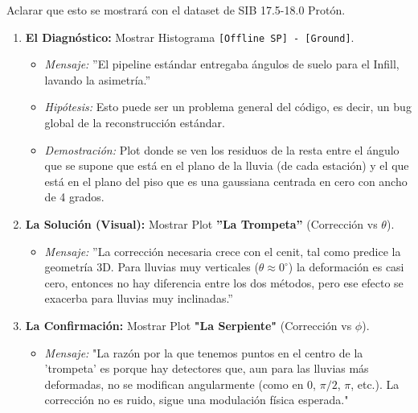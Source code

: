 Aclarar que esto se mostrará con el dataset de SIB 17.5-18.0 Protón.
\begin{enumerate}
	\item \textbf{El Diagnóstico:} Mostrar Histograma \texttt{[Offline SP] - [Ground]}.
	\begin{itemize}
		\item \textit{Mensaje:} ''El pipeline estándar entregaba ángulos de suelo para el Infill, lavando la asimetría.''
		\item \textit{Hipótesis:} Esto puede ser un problema general del código, es decir, un bug global de la reconstrucción estándar.
		\item \textit{Demostración:} Plot donde se ven los residuos de la resta entre el ángulo que se supone que está en el plano de la lluvia (de cada estación) y el que está en el plano del piso que es una gaussiana centrada en cero con ancho de 4 grados.
	\end{itemize}
	\item \textbf{La Solución (Visual):} Mostrar Plot \textbf{''La Trompeta''} (Corrección vs $\theta$).
	\begin{itemize}
		\item \textit{Mensaje:} ''La corrección necesaria crece con el cenit, tal como predice la geometría 3D. Para lluvias muy verticales ($\theta \approx 0^\circ$) la deformación es casi cero, entonces no hay diferencia entre los dos métodos, pero ese efecto se exacerba para lluvias muy inclinadas.''
	\end{itemize}
	\item \textbf{La Confirmación:} Mostrar Plot \textbf{"La Serpiente"} (Corrección vs $\phi$).
	\begin{itemize}
		\item \textit{Mensaje:} "La razón por la que tenemos puntos en el centro de la 'trompeta' es porque hay detectores que, aun para las lluvias más deformadas, no se modifican angularmente (como en $0$, $\pi/2$, $\pi$, etc.). La corrección no es ruido, sigue una modulación física esperada."
	\end{itemize}
\end{enumerate}

